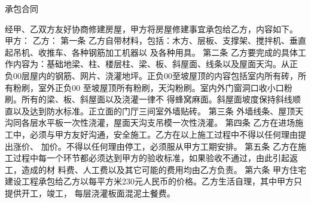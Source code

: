 \documentclass[12pt,a4paper]{article}
\begin{document}
\begin{center}
  \begin{Huge}
    承包合同
  \end{Huge}
\end{center}
经甲、乙双方友好协商修建房屋，甲方将房屋修建事宜承包给乙方，内容如下。
\newline{}
\newline{}
甲方：
\newline{}
\newline{}
乙方：
\newline{}
\newline{}
第一条
\newline{}
乙方自带材料，包括：木方、层板、支撑架、搅拌机、垂直起吊机、收推车、各种钢筋加工机器以
及各种用具。
\newline{}
\newline{}
第二条
\newline{}
乙方要完成的具体工作内容为：基础地梁、柱、楼层柱、梁、板、斜屋面、线条以及屋面天沟。从正
负00层屋内的钢筋、网片、浇灌地坪。正负00至坡屋顶的内容包括室内所有砖，所有粉刷，室外正负00
至坡屋顶所有粉刷，天沟粉刷。室内外门窗洞口收小口粉刷。所有的梁、板、斜屋面以及浇灌一律不
得蜂窝麻面。斜屋面坡度保持斜线顺直以及达到防水标准。正立面的门厅三间室外墙贴砖。
\newline{}
\newline{}
第三条
\newline{}
外墙线条、屋顶天沟同各层水平板一次性浇灌，屋面天沟支吊模一次性浇灌。
\newline{}
\newline{}
第四条
\newline{}
乙方在进场施工中，必须与甲方友好沟通，安全施工。乙方在以上施工过程中不得以任何理由提出涨价、
加价。不得以任何理由停工，必须服从甲方工期安排。
\newline{}
\newline{}
第五条
\newline{}
乙方在施工过程中每一个环节都必须达到甲方的验收标准，如果验收不通过，由此引起返工，造成的材
料费、人工费以及其它可能的费用均由乙方负责。
\newline{}
\newline{}
第六条
\newline{}
甲方住宅建设工程承包给乙方以每平方米230元人民币的价格。乙方生活自理，其中甲方只提供开工，竣工，
每层浇灌板面混泥土餐费。
\newline{}
\newline{}
\end{document}
